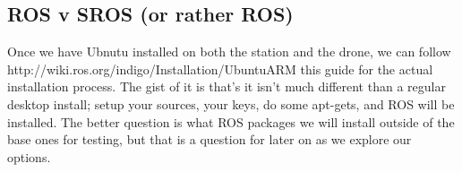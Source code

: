 \documentclass[IEEEtran,letterpaper,10pt,titlepage,draftclsnofoot,onecolumn]{article}
\begin{document}
\subsection*{ROS v SROS (or rather ROS)}
Once we have Ubnutu installed on both the station and the drone, we can follow http://wiki.ros.org/indigo/Installation/UbuntuARM this guide for the actual installation process.
The gist of it is that's it isn't much different than a regular desktop install; setup your sources, your keys, do some 
apt-gets, and ROS will be installed. 
The better question is what ROS packages we will install outside of the base ones for testing, but that is a question for later 
on as we explore our options. 



\end{document}
